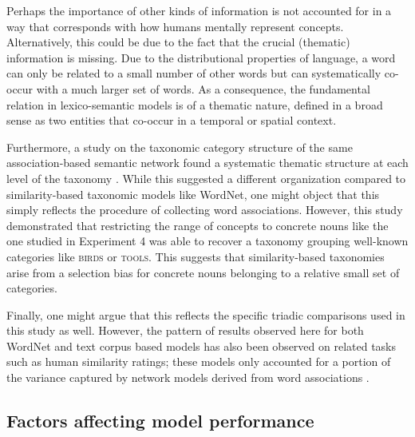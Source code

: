 \documentclass[doc]{apa6}
\newcommand{\stimulus}[1]{\textsc{#1}}
\begin{document}
Perhaps the importance of other kinds of information is not accounted for in a way that corresponds with how humans mentally represent concepts.
Alternatively, this could be due to the fact that the crucial (thematic) information is missing.
Due to the distributional properties of language, a word can only be related to a small number of other words but can systematically co-occur with a much larger set of words. As a consequence, the fundamental relation in lexico-semantic models is of a thematic nature, defined in a broad sense as two entities that co-occur in a temporal or spatial context.


 Furthermore, a study on the taxonomic category structure of the same association-based semantic network found a systematic thematic structure at each level of the taxonomy \parencite{DeDeyneVerheyenNavarro2015}.
 While this suggested a different organization compared to similarity-based taxonomic models like WordNet, one might object that this simply reflects the procedure of collecting word associations. However, this study demonstrated that restricting the range of concepts to concrete nouns like the one studied in Experiment 4 was able to recover a taxonomy grouping well-known categories like \stimulus{birds} or \stimulus{tools}. This suggests that similarity-based taxonomies arise from a selection bias for concrete nouns belonging to a relative small set of categories.

Finally, one might argue that this reflects the specific triadic comparisons used in this study as well. However, the pattern of results observed here for both WordNet and text corpus based models has also been observed on related tasks such as human similarity ratings; these models only accounted for a portion of the variance captured by network models derived from word associations \parencite{DeDeyne2009,DeDeyne2014CorpusSize}.


\subsection{Factors affecting model performance}
\end{document}
